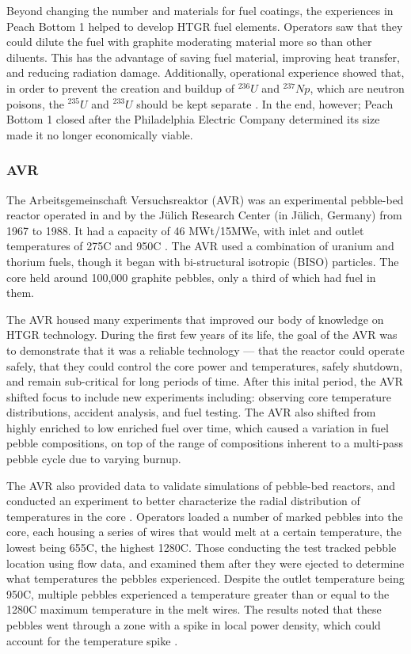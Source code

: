 Beyond changing the number and materials for fuel coatings, the experiences in Peach Bottom 1 helped to develop HTGR fuel elements.  Operators saw that they could dilute the fuel with graphite moderating material more so than other diluents.  This has the advantage of saving fuel material, improving heat transfer, and reducing radiation damage.  Additionally, operational experience showed that, in order to prevent the creation and buildup of $^{236}U$ and $^{237}Np$, which are neutron poisons, the $^{235}U$ and $^{233}U$ should be kept separate \cite{simnad_early_1991}.  In the end, however; Peach Bottom 1 closed after the Philadelphia Electric Company determined its size made it no longer economically viable.

\subsubsection{AVR}
\label{avr}

The Arbeitsgemeinschaft Versuchsreaktor (AVR) was an experimental pebble-bed reactor operated in and by the Jülich Research Center (in Jülich, Germany) from 1967 to 1988.  It had a capacity of 46 MWt/15MWe, with inlet and outlet temperatures of 275\textdegree  C and 950\textdegree  C \cite{beck_high_nodate}.  The AVR used a combination of uranium and thorium fuels, though it began with bi-structural isotropic (BISO) particles.  The core held around 100,000 graphite pebbles, only a third of which had fuel in them.

The AVR housed many experiments that improved our body of knowledge on HTGR technology.  During the first few years of its life, the goal of the AVR was to demonstrate that it was a reliable technology --- that the reactor could operate safely, that they could control the core power and temperatures, safely shutdown, and remain sub-critical for long periods of time.  After this inital period, the AVR shifted focus to include new experiments including: observing core temperature distributions, accident analysis, and fuel testing.  The AVR also shifted from highly enriched to low enriched fuel over time, which caused a variation in fuel pebble compositions, on top of the range of compositions inherent to a multi-pass pebble cycle due to varying burnup.

The AVR also provided data to validate simulations of pebble-bed reactors, and conducted an experiment to better characterize the radial distribution of temperatures in the core \cite{noauthor_results_1990}.  Operators loaded a number of marked pebbles into the core, each housing a series of wires that would melt at a certain temperature, the lowest being 655\textdegree  C, the highest 1280\textdegree  C.  Those conducting the test tracked pebble location using flow data, and examined them after they were ejected to determine what temperatures the pebbles experienced.  Despite the outlet temperature being 950\textdegree  C, multiple pebbles experienced a temperature greater than or equal to the 1280\textdegree C maximum temperature in the melt wires.  The results noted that these pebbles went through a zone with a spike in local power density, which could account for the temperature spike \cite{noauthor_results_1990}.

